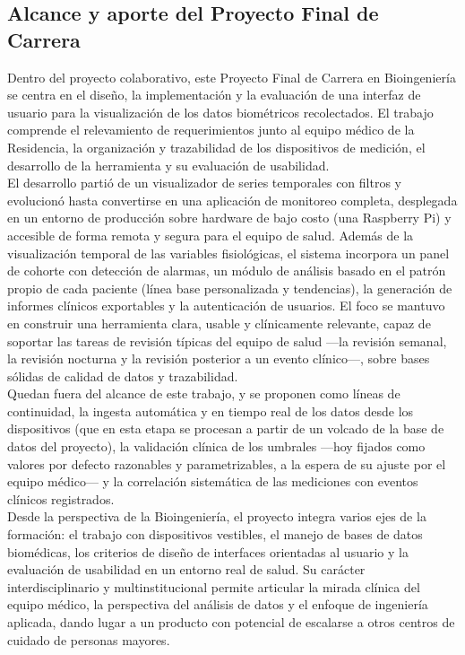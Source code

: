 \subsection{Alcance y aporte del Proyecto Final de Carrera}
Dentro del proyecto colaborativo, este Proyecto Final de Carrera en Bioingeniería se centra en el diseño, la implementación y la evaluación de una interfaz de usuario para la visualización de los datos biométricos recolectados. El trabajo comprende el relevamiento de requerimientos junto al equipo médico de la Residencia, la organización y trazabilidad de los dispositivos de medición, el desarrollo de la herramienta y su evaluación de usabilidad.\\

El desarrollo partió de un visualizador de series temporales con filtros y evolucionó hasta convertirse en una aplicación de monitoreo completa, desplegada en un entorno de producción sobre hardware de bajo costo (una Raspberry Pi) y accesible de forma remota y segura para el equipo de salud. Además de la visualización temporal de las variables fisiológicas, el sistema incorpora un panel de cohorte con detección de alarmas, un módulo de análisis basado en el patrón propio de cada paciente (línea base personalizada y tendencias), la generación de informes clínicos exportables y la autenticación de usuarios. El foco se mantuvo en construir una herramienta clara, usable y clínicamente relevante, capaz de soportar las tareas de revisión típicas del equipo de salud —la revisión semanal, la revisión nocturna y la revisión posterior a un evento clínico—, sobre bases sólidas de calidad de datos y trazabilidad.\\

Quedan fuera del alcance de este trabajo, y se proponen como líneas de continuidad, la ingesta automática y en tiempo real de los datos desde los dispositivos (que en esta etapa se procesan a partir de un volcado de la base de datos del proyecto), la validación clínica de los umbrales —hoy fijados como valores por defecto razonables y parametrizables, a la espera de su ajuste por el equipo médico— y la correlación sistemática de las mediciones con eventos clínicos registrados.\\

Desde la perspectiva de la Bioingeniería, el proyecto integra varios ejes de la formación: el trabajo con dispositivos vestibles, el manejo de bases de datos biomédicas, los criterios de diseño de interfaces orientadas al usuario y la evaluación de usabilidad en un entorno real de salud. Su carácter interdisciplinario y multinstitucional permite articular la mirada clínica del equipo médico, la perspectiva del análisis de datos y el enfoque de ingeniería aplicada, dando lugar a un producto con potencial de escalarse a otros centros de cuidado de personas mayores.\\


